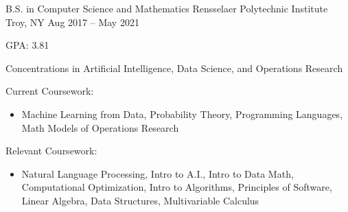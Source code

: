 


\begin{cventries}

  \cventry
  {B.S. in Computer Science and Mathematics}
  {Rensselaer Polytechnic Institute}
  {Troy, NY}
  {Aug 2017 -- May 2021}
  {
    \begin{cvitems}
      \item GPA: 3.81
      \item Concentrations in Artificial Intelligence, Data Science, and Operations Research
      \item Current Coursework:
      \begin{itemize}
        \item Machine Learning from Data, Probability Theory, Programming Languages, Math Models of Operations Research
      \end{itemize}
      \item Relevant Coursework:
      \begin{itemize}
        \item Natural Language Processing, Intro to A.I., Intro to Data Math, Computational Optimization, Intro to Algorithms, \newline Principles of Software, Linear Algebra, Data Structures, Multivariable Calculus
      \end{itemize}
    \end{cvitems}
  }


\end{cventries}